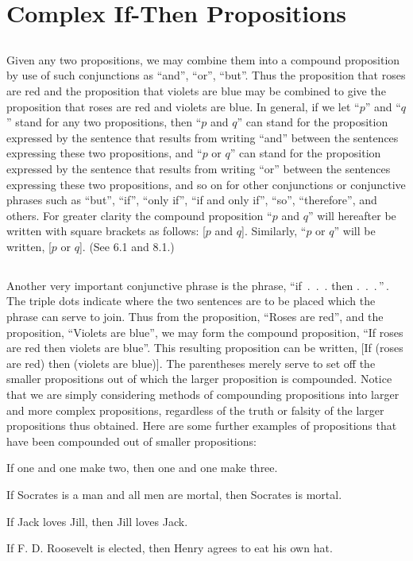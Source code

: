 \documentclass{book}
\let\oldmarginpar\marginpar
\renewcommand*{\marginpar}[1]{\oldmarginpar{\footnotesize#1}}
\begin{document}
\section{Complex If-Then Propositions}
\label{sec:3}

\subsection{}
\label{sec:3.1}

Given any two propositions, we may combine them into a compound proposition by use of such conjunctions as “and”, “or”, “but”.  Thus the proposition that roses are red and the proposition that violets are blue may be combined to give the proposition that roses are red and violets are blue.  In general, if we let “\(p\)” and “\(q\)” stand for any two propositions, then “\(p\) and \(q\)” can stand for the proposition expressed by the sentence that results from writing “and” between the sentences expressing these two propositions, and “\(p\) or \(q\)” can stand for the proposition expressed by the sentence that results from writing “or” between the sentences expressing these two propositions, and so on for other conjunctions or conjunctive phrases such as “but”, “if”, “only if”, “if and only if”, “so”, “therefore”, and others.  For greater clarity the compound proposition “\(p\) and \(q\)” will hereafter be written with square brackets as follows: [\(p\) and \(q\)].  Similarly, “\(p\) or \(q\)” will be written, [\(p\) or \(q\)].  (See 6.1 and 8.1.)

\subsection{}
\label{sec:3.2}

Another \marginpar{10}very important conjunctive phrase is the phrase, “if~.~.~. then .~.~.\,”\,.  The triple dots indicate where the two sentences are to be placed which the phrase can serve to join.  Thus from the proposition, “Roses are red”, and the proposition, “Violets are blue”, we may form the compound proposition, “If roses are red then violets are blue”.  This resulting proposition can be written, [If (roses are red) then (violets are blue)].  The parentheses merely serve to set off the smaller propositions out of which the larger proposition is compounded.  Notice that we are simply considering methods of compounding propositions into larger and more complex propositions, regardless of the truth or falsity of the larger propositions thus obtained.  Here are some further examples of propositions that have been compounded out of smaller propositions:
\begin{description}[left=2\parindent,itemindent=-2ex,labelsep=0pt, nosep,topsep=3pt]
\item If one and one make two, then one and one make three.
\item If Socrates is a man and all men are mortal, then Socrates is mortal.
\item If Jack loves Jill, then Jill loves Jack.
\item If F. D. Roosevelt is elected, then Henry agrees to eat his own hat.
\end{description}
\end{document}
